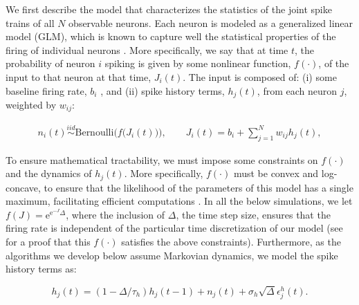 We first describe the model that characterizes the statistics of the joint spike trains of all $N$ observable neurons.  Each neuron is modeled as a generalized linear model (GLM), which is known to capture well the statistical properties of the firing of individual neurons \cite{PILL07, PAN03d, Wu07, Rigat06, OKA05}.  More specifically, we say that at time $t$, the probability of neuron $i$ spiking is given by some nonlinear function, $f(\cdot)$, of the input to that neuron at that time, $J_i(t)$.  The input is composed of: (i) some baseline firing rate, $b_i$%
, and (ii) spike history terms, $h_j(t)$, from each neuron $j$, weighted by $w_{ij}$:

\begin{equation} \label{eqn:glm:definition}
\begin{array}{l}
n_i(t)\overset{iid}{\sim} \text{Bernoulli}\big(f\big(J_i(t)\big)\big), \qquad %
J_i(t)=b_i+\sum \limits_{j=1}^{N}  w_{ij} h_{j}(t), %
\end{array}
\end{equation}

\noindent To ensure mathematical tractability, we must impose some constraints on $f(\cdot)$ and the dynamics of $h_j(t)$.  More specifically, $f(\cdot)$ must be convex and log-concave, to ensure that the likelihood of the parameters of this model has a single maximum, facilitating efficient computations \cite{PAN03d}.  In all the below simulations, we let $f(J)=\text{e}^{\text{e}^{-J}\Delta}$, where the inclusion of $\Delta$, the time step size, ensures that the firing rate is independent of the particular time discretization of our model (see \cite{??} for a proof that this $f(\cdot)$ satisfies the above constraints).  Furthermore, as the algorithms we develop below assume Markovian dynamics, we model the spike history terms as:

\begin{equation} \label{eqn:h:definition}
h_j(t) = (1- \Delta/\tau_h) h_j(t-1) +n_j(t) + \sigma_h \sqrt{\Delta} \epsilon^h_j(t).
\end{equation}

